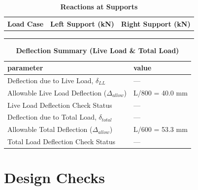 \documentclass[12pt,a4paper]{report}
\numberwithin{table}{chapter}
\numberwithin{figure}{chapter}
\begin{document}
\vspace{1em}
\begin{longtable}{|>{\centering\arraybackslash}p{5.2cm}|>{\centering\arraybackslash}p{5.2cm}|>{\centering\arraybackslash}p{5.2cm}|}
\caption{\textbf{Reactions at Supports}}
\hline
\textbf{Load Case} & \textbf{Left Support (kN)} & \textbf{Right Support (kN)} \\[6pt]
\hline
 &  &  \\[6pt]
\hline
 &  &  \\[6pt]
\hline
 &  &  \\[6pt]
\hline
\end{longtable}

\vspace{1em}
\begin{longtable}{|L{7cm}|p{8.5cm}|}
\caption{\textbf{Deflection Summary (Live Load \& Total Load)}}
\hline
\textbf{parameter} & \textbf{value} \\
\hline
\textnormal{Deflection due to Live Load, $\delta_{LL}$} & --- \\[6pt]
\hline
\textnormal{Allowable Live Load Deflection ($\Delta_{allow}$)} & L/800 = 40.0 mm \\[6pt]
\hline
\textnormal{Live Load Deflection Check Status} & --- \\[6pt]
\hline
\textnormal{Deflection due to Total Load, $\delta_{total}$} & --- \\[6pt]
\hline
\textnormal{Allowable Total Deflection ($\Delta_{allow}$)} & L/600 = 53.3 mm \\[6pt]
\hline
\textnormal{Total Load Deflection Check Status} & --- \\[6pt]
\hline
\end{longtable}

\vspace{1em}
\noindent
\noindent{}
\noindent{}
\noindent{}


\chapter{Design Checks}
\end{document}

